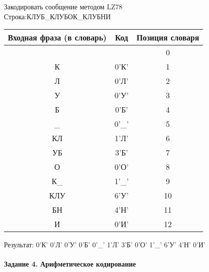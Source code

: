 \documentclass[a4paper, 12pt]{article}
\begin{document}
Закодировать сообщение методом LZ78\\
Строка:КЛУБ\_КЛУБОК\_КЛУБНИ\\
\begin{table}[h!]
\centering
\begin{tabular}{|c|c|c|} 
\hline
 Входная фраза (в словарь) & Код & Позиция словаря \\ \hline

 &  & 0 \\ \hline
К & 0'К' & 1 \\ \hline
Л & 0'Л' & 2 \\ \hline
У & 0'У' & 3 \\ \hline
Б & 0'Б' & 4 \\ \hline
\_ & 0'\_' & 5 \\ \hline
КЛ & 1'Л' & 6 \\ \hline
УБ & 3'Б' & 7 \\ \hline
О & 0'О' & 8 \\ \hline
К\_ & 1'\_' & 9 \\ \hline
КЛУ & 6'У' & 10 \\ \hline
БН & 4'Н' & 11 \\ \hline
И & 0'И' & 12 \\ \hline
\end{tabular}
\end{table}

Результат: 0'К' 0'Л' 0'У' 0'Б' 0'\_' 1'Л' 3'Б' 0'О' 1'\_' 6'У' 4'Н' 0'И'\\
\pagebreak
\paragraph{Задание 4. Арифметическое кодирование\\}
\end{document}
